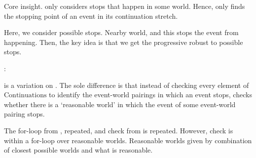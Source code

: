 \begin{note}
  Core insight.
  \citeauthor{Landman:1992wh} only considers stops that happen in some world.
  Hence, \AlgGetStops{} only finds the stopping point of an event in its continuation stretch.

  





  Here, we consider possible stops.
  Nearby world, and this stops the event from happening.
  Then, the key idea is that we get the progressive robust to possible stops.

  \AlgGetPStops{}:

  \begin{algorithm}[H]
    \label{PrAl:g-s}
    \caption{\AlgGetPStops{}}
    \SetAlgoLined
    \DontPrintSemicolon
  \end{algorithm}

  \AlgGetPStops{} is a variation on \AlgGetStops{}.
  The sole difference is that instead of checking every element of \(\text{Continuations}\) to identify the event-world pairings in which an event stops, \AlgGetPStops{} checks whether there is a `reasonable world' in which the event of some event-world pairing stops.
\end{note}

\begin{note}
  The for-loop from \AlgGetStops{}, repeated, and check from \AlgGetStops{} is repeated.
  However, check is within a for-loop over reasonable worlds.
  Reasonable worlds given by combination of closest possible worlds and what is reasonable.
\end{note}

